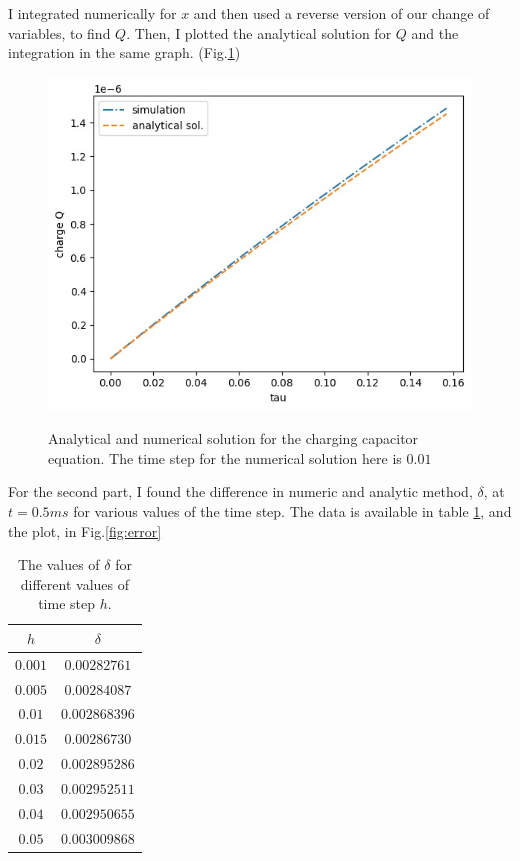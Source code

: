 \documentclass[12pt, a4paper]{article}
\begin{document}
	I integrated numerically for $x$ and then used a reverse version of our change of variables, to find $Q$. Then, I plotted the analytical solution
	for $Q$ and the integration in the same graph. (Fig.\ref{fig:euler})
	\begin{figure}[h!]
		\centering
		\includegraphics[width=0.8\linewidth]{../p1/capacitor.jpg}
		\label{fig:euler}
		\caption{Analytical and numerical solution for the charging capacitor equation. The time step for the numerical solution here is $0.01$}
	\end{figure}

	For the second part, I found the difference in numeric and analytic method, $\delta$, at $t = 0.5 ms$ for various values of the time step.
	The data is available in table \ref{tab:error}, and the plot, in Fig.\ref{fig:error}
	\begin{table}[h!]
		\centering
		\begin{tabular}{|c|c|}
			\hline
			$h$ & $\delta$\\
			\hline
			$0.001$ & $0.00282761$ \\
			\hline
			$0.005$ & $0.00284087$ \\
			\hline
			$0.01$ & $0.002868396$ \\
			\hline
			$0.015$ & $0.00286730$ \\
			\hline
			$0.02$ & $0.002895286$ \\
			\hline
			$0.03$ & $0.002952511$ \\
			\hline
			$0.04$ & $0.002950655$ \\
			\hline
			$0.05$ & $0.003009868$ \\
			\hline
		\end{tabular}
	\label{tab:error}
	\caption{The values of $\delta$ for different values of time step $h$.}
	\end{table}
	
\end{document}
